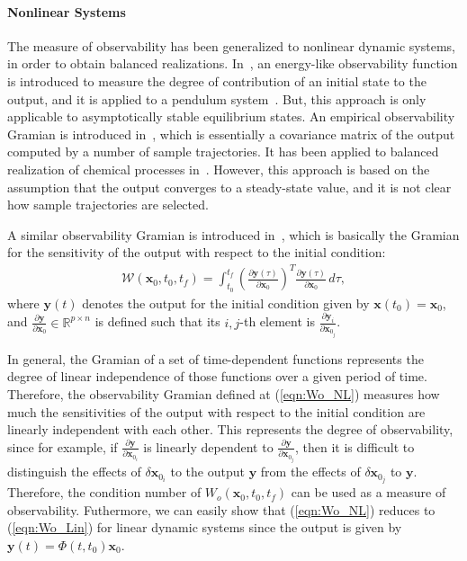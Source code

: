 \documentclass[10pt]{article}
\newcommand{\parenth}[1]{\ensuremath{\left( #1 \right)}}
\newcommand{\refeqn}[1]{(\ref{eqn:#1})}
\newcommand{\deriv}[2]{\ensuremath{\frac{\partial #1}{\partial #2}}}
\renewcommand{\Re}{\ensuremath{\mathbb{R}}}
\newcommand{\x}{\ensuremath{\mathbf{x}}}
\newcommand{\y}{\mathbf{y}}
\begin{document}
\paragraph{Nonlinear Systems} The measure of observability has been generalized to nonlinear dynamic systems, in order to obtain balanced realizations. In~\cite{SchSCL93,Sch94}, an energy-like observability function is introduced to measure the degree of contribution of an initial state to the output, and it is applied to a pendulum system~\cite{NewKriPICDC98}. But, this approach is only applicable to asymptotically stable equilibrium states. An empirical observability Gramian is introduced in~\cite{LalMarPIWC99,LalMarIJRNC02}, which is essentially a covariance matrix of the output computed by a number of sample trajectories. It has been applied to balanced realization of chemical processes in~\cite{HahEdgJPC03,HahEdgCCE02}. However, this approach is based on the assumption that the output converges to a steady-state value, and it is not clear how  sample trajectories are selected. 

A similar observability Gramian is introduced in~\cite{KreIdePICDC09}, which is basically the Gramian for the sensitivity of the output with respect to the initial condition:
\begin{align}
\mathcal{W} (\x_0,t_0,t_f) = \int_{t_0}^{t_f} \parenth{\deriv{\y(\tau)}{\x_0}}^T\deriv{\y(\tau)}{\x_0}\,d\tau,\label{eqn:Wo_NL}
\end{align}
where $\y(t)$ denotes the output for the initial condition given by $\x(t_0)=\x_0$, and $\deriv{\y}{\x_0}\in\Re^{p\times n}$ is defined such that its $i,j$-th element is $\deriv{\y_i}{\x_{0_j}}$. 

In general, the Gramian of a set of time-dependent functions represents the degree of linear independence of those functions over a given period of time. Therefore, the observability Gramian defined at \refeqn{Wo_NL} measures how much the sensitivities of the output with respect to the initial condition are linearly independent with each other. This represents the degree of observability, since for example, if $\deriv{\y}{\x_{0_i}}$ is linearly dependent to $\deriv{\y}{\x_{0_j}}$, then it is difficult to distinguish the effects of $\delta \x_{0_i}$ to the output $\y$ from the effects of $\delta \x_{0_j}$ to $\y$. Therefore, the condition number of $W_o (\x_0,t_0,t_f)$ can be used as a measure of observability. Futhermore, we can easily show that \refeqn{Wo_NL} reduces to \refeqn{Wo_Lin} for linear dynamic systems since the output is given by $\y(t) = \Phi(t,t_0)\x_0$. 
\end{document}
